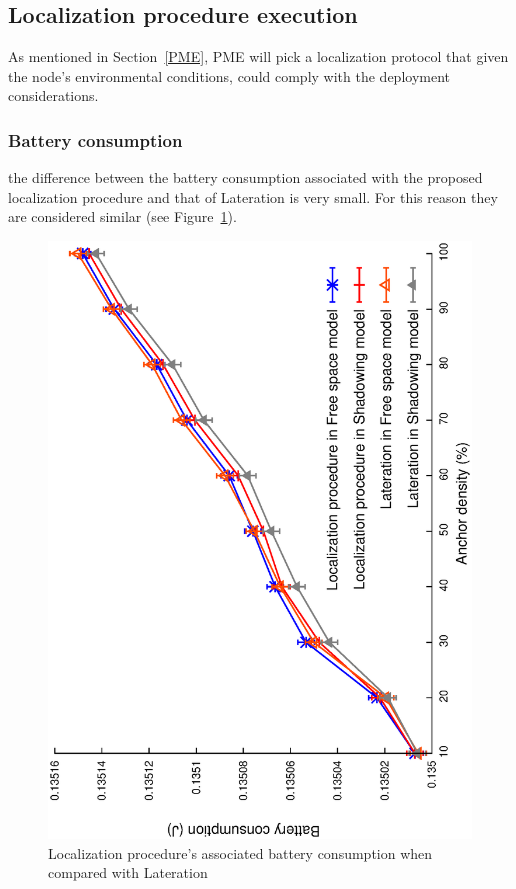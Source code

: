 
\subsection{Localization procedure execution}\label{locProc_executions}
As mentioned in Section~\ref{PME}, PME will pick a localization protocol that given the node's environmental conditions, could comply with the deployment considerations.

\subsubsection{Battery consumption}
the difference between the battery consumption associated with the proposed localization procedure and that of Lateration is very small. For this reason they are considered similar (see Figure~\ref{pme:battery}).

\begin{figure}[htbp]
  \centering
  \includegraphics[width=0.7\linewidth, angle = -90]{section4/figures/pmeBat.eps}
  \caption{Localization procedure's associated battery consumption when compared with Lateration
  \label{pme:battery}}
\end{figure}

